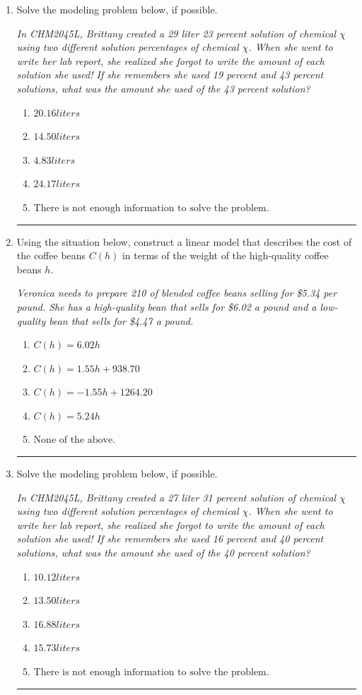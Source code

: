 \documentclass[14pt]{extbook}
\newcommand{\litem}[1]{\item#1\hspace*{-1cm}\rule{\textwidth}{0.4pt}}
\begin{document}
\begin{enumerate}
{\begin{enumerate}[label=\Alph*.]
\end{enumerate} }
\litem{
Solve the modeling problem below, if possible.
\begin{center}
    \textit{ In CHM2045L, Brittany created a 29 liter 23 percent solution of chemical $\chi$ using two different solution percentages of chemical $\chi$. When she went to write her lab report, she realized she forgot to write the amount of each solution she used! If she remembers she used 19 percent and 43 percent solutions, what was the amount she used of the 43 percent solution? }
\end{center}
\begin{enumerate}[label=\Alph*.]
\item \( 20.16 liters \)
\item \( 14.50 liters \)
\item \( 4.83 liters \)
\item \( 24.17 liters \)
\item \( \text{There is not enough information to solve the problem.} \)

\end{enumerate} }
\litem{
Using the situation below, construct a linear model that describes the cost of the coffee beans $C(h)$ in terms of the weight of the high-quality coffee beans $h$.
\begin{center}
    \textit{ Veronica needs to prepare 210 of blended coffee beans selling for \$5.34 per pound. She has a high-quality bean that sells for \$6.02 a pound and a low-quality bean that sells for \$4.47 a pound. }
\end{center}
\begin{enumerate}[label=\Alph*.]
\item \( C(h) = 6.02 h \)
\item \( C(h) = 1.55 h + 938.70 \)
\item \( C(h) = -1.55 h + 1264.20 \)
\item \( C(h) = 5.24 h \)
\item \( \text{None of the above.} \)

\end{enumerate} }
\litem{
Solve the modeling problem below, if possible.
\begin{center}
    \textit{ In CHM2045L, Brittany created a 27 liter 31 percent solution of chemical $\chi$ using two different solution percentages of chemical $\chi$. When she went to write her lab report, she realized she forgot to write the amount of each solution she used! If she remembers she used 16 percent and 40 percent solutions, what was the amount she used of the 40 percent solution? }
\end{center}
\begin{enumerate}[label=\Alph*.]
\item \( 10.12 liters \)
\item \( 13.50 liters \)
\item \( 16.88 liters \)
\item \( 15.73 liters \)
\item \( \text{There is not enough information to solve the problem.} \)


\end{enumerate}}
\end{enumerate}
\end{document}
